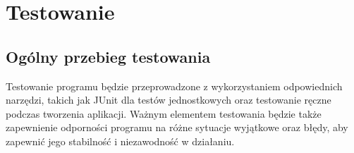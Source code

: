 \documentclass{article}
\begin{document}
    \section{Testowanie}
  \subsection{Ogólny przebieg testowania}
Testowanie programu będzie przeprowadzone z wykorzystaniem odpowiednich narzędzi, takich jak JUnit dla testów jednostkowych oraz testowanie ręczne podczas tworzenia aplikacji. Ważnym elementem testowania będzie także zapewnienie odporności programu na różne sytuacje wyjątkowe oraz błędy, aby zapewnić jego stabilność i niezawodność w działaniu.
\end{document}
